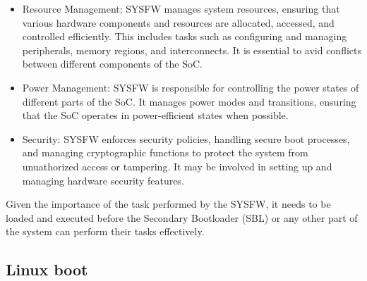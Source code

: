 \begin{itemize}
    \item   Resource Management: SYSFW manages system resources, ensuring that
            various hardware components and resources are allocated, accessed,
            and controlled efficiently. This includes tasks such as configuring
            and managing peripherals, memory regions, and interconnects. It is
            essential to avid conflicts between different components of the SoC.
    \item   Power Management: SYSFW is responsible for controlling the power
            states of different parts of the SoC. It manages power modes and
            transitions, ensuring that the SoC operates in power-efficient
            states when possible.
    \item   Security: SYSFW enforces security policies, handling secure boot
            processes, and managing cryptographic functions to protect the
            system from unuathorized access or tampering. It may be involved in
            setting up and managing hardware security features.
\end{itemize}

Given the importance of the task performed by the SYSFW, it needs to be loaded
and executed before the Secondary Bootloader (SBL) or any other part of the
system can perform their tasks effectively.

\subsection{Linux boot}
